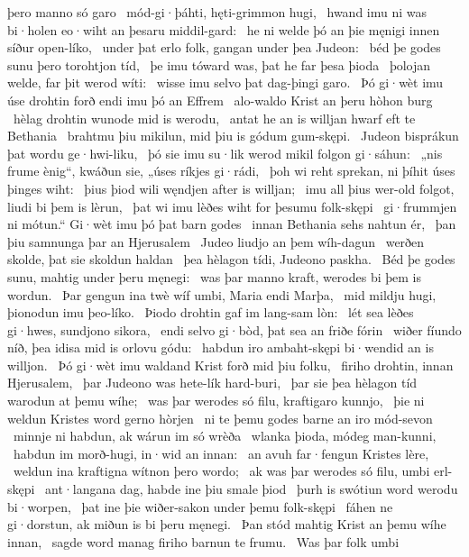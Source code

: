 þero manno só garo \hld\ mód-gi·þáhti,
hęti-grimmon hugi, \hld\ hwand imu ni was bi·holen eo·wiht
an þesaru middil-gard: \hld\ he ni welde þó an þie męnigi innen
síður open-líko, \hld\ under þat erlo folk,
gangan under þea Judeon: \hld\ béd þe godes sunu
þero torohtjon tíd, \hld\ þe imu tóward was,
þat he far þesa þioda \hld\ þolojan welde,
far þit werod wíti: \hld\ wisse imu selvo
þat dag-þingi garo. \hld\ Þó gi·wèt imu úse drohtin forð
endi imu þó an Effrem \hld\ alo-waldo Krist
an þeru hòhon burg \hld\ hèlag drohtin
wunode mid is werodu, \hld\ antat he an is willjan hwarf
eft te Bethania \hld\ brahtmu þiu mikilun,
mid þiu is gódum gum-skępi. \hld\ Judeon bisprákun þat
wordu ge·hwi-liku, \hld\ þó sie imu su·lik werod mikil
folgon gi·sáhun: \hld\ „nis frume ènig“, kwáðun sie,
„úses ríkjes gi·rádi, \hld\ þoh wi reht sprekan,
ni þíhit úses þinges wiht: \hld\ þius þiod wili
węndjen after is willjan; \hld\ imu all þius wer-old folgot,
liudi bi þem is lèrun, \hld\ þat wi imu lèðes wiht
for þesumu folk-skępi \hld\ gi·frummjen ni mótun.“
Gi·wèt imu þó þat barn godes \hld\ innan Bethania
sehs nahtun ér, \hld\ þan þiu samnunga
þar an Hjerusalem \hld\ Judeo liudjo
an þem wíh-dagun \hld\ werðen skolde,
þat sie skoldun haldan \hld\ þea hèlagon tídi,
Judeono paskha. \hld\ Béd þe godes sunu,
mahtig under þeru męnegi: \hld\ was þar manno kraft,
werodes bi þem is wordun. \hld\ Þar gengun ina twè wíf umbi,
Maria endi Marþa, \hld\ mid mildju hugi,
þionodun imu þeo-líko. \hld\ Þiodo drohtin
gaf im lang-sam lòn: \hld\ lét sea lèðes gi·hwes,
sundjono sikora, \hld\ endi selvo gi·bòd,
þat sea an friðe fórin \hld\ wiðer fíundo níð,
þea idisa mid is orlovu gódu: \hld\ habdun iro ambaht-skępi
bi·wendid an is willjon. \hld\ Þó gi·wèt imu waldand Krist
forð mid þiu folku, \hld\ firiho drohtin,
innan Hjerusalem, \hld\ þar Judeono was
hete-lík hard-buri, \hld\ þar sie þea hèlagon tíd
warodun at þemu wíhe; \hld\ was þar werodes só filu,
kraftigaro kunnjo, \hld\ þie ni weldun Kristes word
gerno hòrjen \hld\ ni te þemu godes barne
an iro mód-sevon \hld\ minnje ni habdun,
ak wárun im só wrèða \hld\ wlanka þioda,
módeg man-kunni, \hld\ habdun im morð-hugi,
in·wid an innan: \hld\ an avuh far·fengun
Kristes lère, \hld\ weldun ina kraftigna
wítnon þero wordo; \hld\ ak was þar werodes só filu,
umbi erl-skępi \hld\ ant·langana dag,
habde ine þiu smale þiod \hld\ þurh is swótiun word
werodu bi·worpen, \hld\ þat ine þie wiðer-sakon
under þemu folk-skępi \hld\ fáhen ne gi·dorstun,
ak miðun is bi þeru męnegi. \hld\ Þan stód mahtig Krist
an þemu wíhe innan, \hld\ sagde word manag
firiho barnun te frumu. \hld\ Was þar folk umbi
